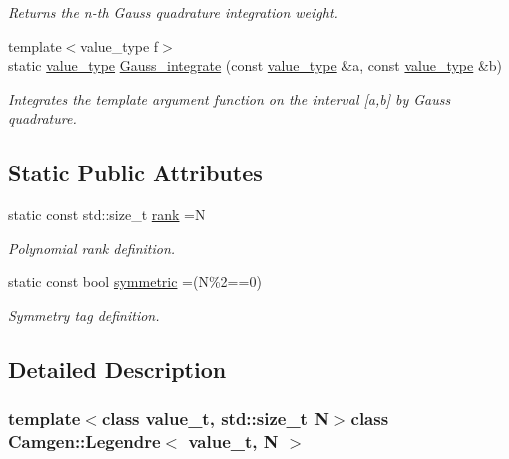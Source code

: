 \begin{DoxyCompactItemize}
\begin{DoxyCompactList}\small\item\em Returns the n-\/th Gauss quadrature integration weight. \end{DoxyCompactList}\item 
{\footnotesize template$<$value\-\_\-type  f$>$ }\\static \hyperlink{a00319_a6eb9a63823f5074b09c8c916818d94e7}{value\-\_\-type} \hyperlink{a00319_a065a10559bc657e1e00b20a6394d35b1}{Gauss\-\_\-integrate} (const \hyperlink{a00319_a6eb9a63823f5074b09c8c916818d94e7}{value\-\_\-type} \&a, const \hyperlink{a00319_a6eb9a63823f5074b09c8c916818d94e7}{value\-\_\-type} \&b)
\begin{DoxyCompactList}\small\item\em Integrates the template argument function on the interval \mbox{[}a,b\mbox{]} by Gauss quadrature. \end{DoxyCompactList}\end{DoxyCompactItemize}
\subsection*{Static Public Attributes}
\begin{DoxyCompactItemize}
\item 
\hypertarget{a00319_a42d6b56dc79967ab2a8e8996a8c3161c}{static const std\-::size\-\_\-t \hyperlink{a00319_a42d6b56dc79967ab2a8e8996a8c3161c}{rank} =N}\label{a00319_a42d6b56dc79967ab2a8e8996a8c3161c}

\begin{DoxyCompactList}\small\item\em Polynomial rank definition. \end{DoxyCompactList}\item 
\hypertarget{a00319_a43fe30b8944276252e2545ac464e1fe6}{static const bool \hyperlink{a00319_a43fe30b8944276252e2545ac464e1fe6}{symmetric} =(N\%2==0)}\label{a00319_a43fe30b8944276252e2545ac464e1fe6}

\begin{DoxyCompactList}\small\item\em Symmetry tag definition. \end{DoxyCompactList}\end{DoxyCompactItemize}


\subsection{Detailed Description}
\subsubsection*{template$<$class value\-\_\-t, std\-::size\-\_\-t N$>$class Camgen\-::\-Legendre$<$ value\-\_\-t, N $>$}

